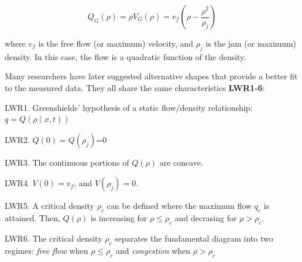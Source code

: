 \documentclass[11pt]{article}
\numberwithin{equation}{section}
\numberwithin{figure}{section}
\numberwithin{table}{section}
\begin{document}
\begin{equation} \label{eq:greenshieldsFlux}
Q_{G}(\rho) = \rho V_{G}(\rho) = v_{f}(\rho-\frac{\rho^{2}}{\rho_{j}})
\end{equation}

where $v_{f}$ is the free flow (or maximum) velocity, and $\rho_{j}$ is the jam (or maximum) density. In this case, the flow is a quadratic function of the density. 

Many researchers have later suggested alternative shapes that provide a better fit to the measured data. They all share the same characteristics \textbf{LWR1-6}:

LWR1. Greenshields' hypothesis of a static flow/density relationship: $q = Q(\rho(x,t))$

LWR2. $Q(0)=Q(\rho_{j})$=0

LWR3. The continuous portions of $Q(\rho)$ are concave.

LWR4. $V(0) = v_{f}$, and $V(\rho_{j}) = 0$.

LWR5. A critical density $\rho_{c}$ can be defined where the maximum flow $q_{c}$ is attained. Then, $Q(\rho)$ is increasing for $\rho \leq \rho_{c}$ and decrasing for $\rho > \rho_{c}$.

LWR6. The critical density $\rho_{c}$ separates the fundamental diagram into two regimes: \textit{free flow} when $\rho \leq \rho_{c}$ and \textit{congestion} when $\rho > \rho_{c}$
\end{document}
